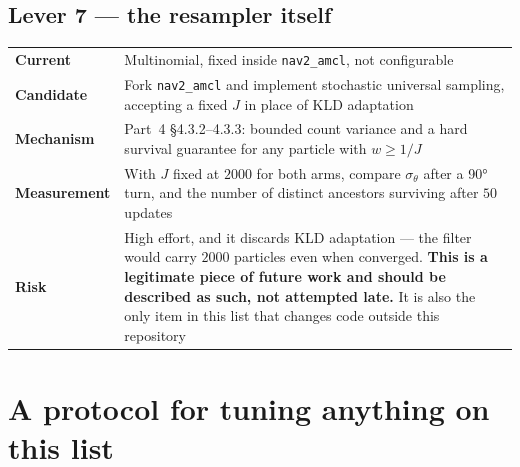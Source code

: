 \documentclass[11pt,a4paper]{report}
\newcommand{\file}[1]{\texttt{\small #1}}
\begin{document}
\subsection{Lever 7 --- the resampler itself}

\begin{center}
\small
\begin{tabular}{@{}p{}p{}@{}}
\toprule
\textbf{Current} & Multinomial, fixed inside \file{nav2\_amcl}, not configurable \\
\textbf{Candidate} & Fork \file{nav2\_amcl} and implement stochastic universal
  sampling, accepting a fixed $J$ in place of KLD adaptation \\
\textbf{Mechanism} & Part~4 \S4.3.2--4.3.3: bounded count variance and a hard
  survival guarantee for any particle with $w \ge 1/J$ \\
\textbf{Measurement} & With $J$ fixed at $2000$ for both arms, compare
  $\sigma_\theta$ after a \ang{90} turn, and the number of distinct ancestors
  surviving after $50$ updates \\
\textbf{Risk} & High effort, and it discards KLD adaptation --- the filter
  would carry $2000$ particles even when converged. \textbf{This is a
  legitimate piece of future work and should be described as such, not
  attempted late.} It is also the only item in this list that changes code
  outside this repository \\
\bottomrule
\end{tabular}
\end{center}

\section{A protocol for tuning anything on this list}
\end{document}
